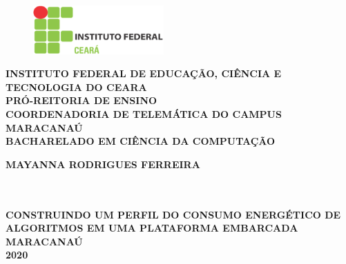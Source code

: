 \thispagestyle{empty}

\vfill
 \begin{center}
    \begin{figure}[t]
     \centering
            \includegraphics[width=5cm]{figures/IF_logo.eps}\\[-0.1in]
     \end{figure}

    {\large\bfseries INSTITUTO FEDERAL DE EDUCAÇÃO, CIÊNCIA E TECNOLOGIA DO CEARA} \\
    {\large\bfseries PRÓ-REITORIA DE ENSINO} \\
    {\large\bfseries COORDENADORIA DE TELEMÁTICA DO CAMPUS MARACANAÚ}  \\ 
    {\large\bfseries BACHARELADO EM CIÊNCIA DA COMPUTAÇÃO}  \\ 

    \vspace*{1in}
    \begin{large} \bfseries MAYANNA RODRIGUES FERREIRA \end{large}\\[0.4in]

    \vspace*{4cm}
    \noindent \\
    \large\bfseries{ CONSTRUINDO UM PERFIL DO CONSUMO ENERGÉTICO DE ALGORITMOS EM UMA PLATAFORMA EMBARCADA } \\
    \vfill
    \large\bfseries{ MARACANAÚ \\ 2020}
\end{center}

\normalsize